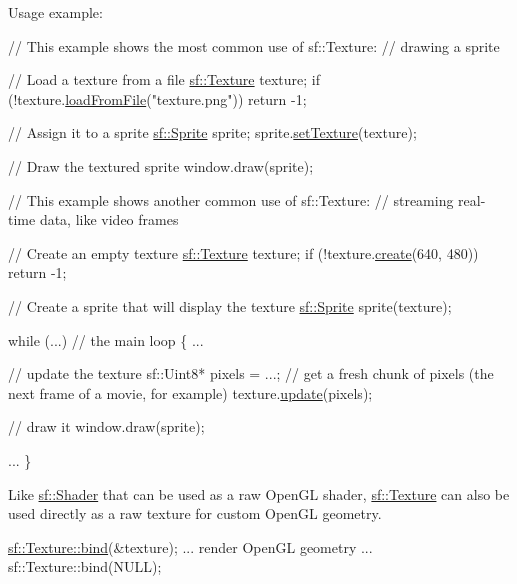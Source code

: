Usage example\+: 
\begin{DoxyCode}
\textcolor{comment}{// This example shows the most common use of sf::Texture:}
\textcolor{comment}{// drawing a sprite}

\textcolor{comment}{// Load a texture from a file}
\hyperlink{classsf_1_1Texture}{sf::Texture} texture;
\textcolor{keywordflow}{if} (!texture.\hyperlink{classsf_1_1Texture_a8e1b56eabfe33e2e0e1cb03712c7fcc7}{loadFromFile}(\textcolor{stringliteral}{"texture.png"}))
    \textcolor{keywordflow}{return} -1;

\textcolor{comment}{// Assign it to a sprite}
\hyperlink{classsf_1_1Sprite}{sf::Sprite} sprite;
sprite.\hyperlink{classsf_1_1Sprite_a3729c88d88ac38c19317c18e87242560}{setTexture}(texture);

\textcolor{comment}{// Draw the textured sprite}
window.draw(sprite);
\end{DoxyCode}



\begin{DoxyCode}
\textcolor{comment}{// This example shows another common use of sf::Texture:}
\textcolor{comment}{// streaming real-time data, like video frames}

\textcolor{comment}{// Create an empty texture}
\hyperlink{classsf_1_1Texture}{sf::Texture} texture;
\textcolor{keywordflow}{if} (!texture.\hyperlink{classsf_1_1Texture_a89b4c7d204acf1033c3a1b6e0a3ad0a3}{create}(640, 480))
    \textcolor{keywordflow}{return} -1;

\textcolor{comment}{// Create a sprite that will display the texture}
\hyperlink{classsf_1_1Sprite}{sf::Sprite} sprite(texture);

\textcolor{keywordflow}{while} (...) \textcolor{comment}{// the main loop}
\{
    ...

    \textcolor{comment}{// update the texture}
    sf::Uint8* pixels = ...; \textcolor{comment}{// get a fresh chunk of pixels (the next frame of a movie, for example)}
    texture.\hyperlink{classsf_1_1Texture_ae4eab5c6781316840b0c50ad08370963}{update}(pixels);

    \textcolor{comment}{// draw it}
    window.draw(sprite);

    ...
\}
\end{DoxyCode}


Like \hyperlink{classsf_1_1Shader}{sf\+::\+Shader} that can be used as a raw Open\+GL shader, \hyperlink{classsf_1_1Texture}{sf\+::\+Texture} can also be used directly as a raw texture for custom Open\+GL geometry. 
\begin{DoxyCode}
\hyperlink{classsf_1_1Texture_ae9a4274e7b95ebf7244d09c7445833b0}{sf::Texture::bind}(&texture);
... render OpenGL geometry ...
sf::Texture::bind(NULL);
\end{DoxyCode}


